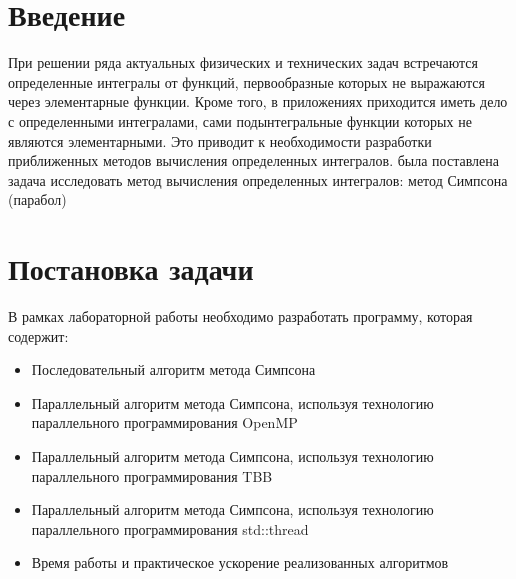 \documentclass{report}
\begin{document}
\setcounter{page}{2}

\tableofcontents
\newpage

\section*{Введение}
При решении ряда актуальных физических и технических задач встречаются определенные интегралы от функций, первообразные которых не выражаются через элементарные функции. Кроме того, в приложениях приходится иметь дело с определенными интегралами, сами подынтегральные функции которых не являются элементарными. Это приводит к необходимости разработки приближенных методов вычисления определенных интегралов.
 была поставлена задача исследовать метод вычисления определенных интегралов: метод Симпсона (парабол)
\newpage

\section*{Постановка задачи}
В рамках лабораторной работы необходимо разработать программу, которая содержит:  
\begin{itemize}
    \item Последовательный алгоритм метода Симпсона
   \item Параллельный алгоритм метода Симпсона, используя технологию параллельного программирования OpenMP
    \item Параллельный алгоритм метода Симпсона, используя технологию параллельного программирования TBB
    \item Параллельный алгоритм метода Симпсона, используя технологию параллельного программирования std::thread
    \item Время работы и практическое ускорение реализованных алгоритмов
\end{itemize}
\newpage

\end{document}
